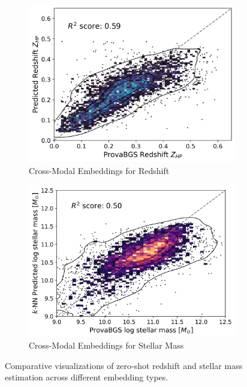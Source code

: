 \documentclass[a4paper,12pt]{article}
\begin{document}
\begin{figure}[H]
    \begin{subfigure}[b]{0.48\textwidth}
        \centering
        \includegraphics[width=\textwidth]{../figures/zeroshot_redshift_crossmodal.png}
        \caption{Cross-Modal Embeddings for Redshift}
        \label{fig:redshift_crossmodal}
    \end{subfigure}%
    \hfill
    \begin{subfigure}[b]{0.48\textwidth}
        \centering
        \includegraphics[width=\textwidth]{../figures/zeroshot_stellarmass_crossmodal.png}
        \caption{Cross-Modal Embeddings for Stellar Mass}
        \label{fig:stellarmass_crossmodal}
    \end{subfigure}

    \caption{Comparative visualizations of zero-shot redshift and stellar mass estimation across different embedding types.}
    \label{fig:zeroshot}
\end{figure}
\end{document}
